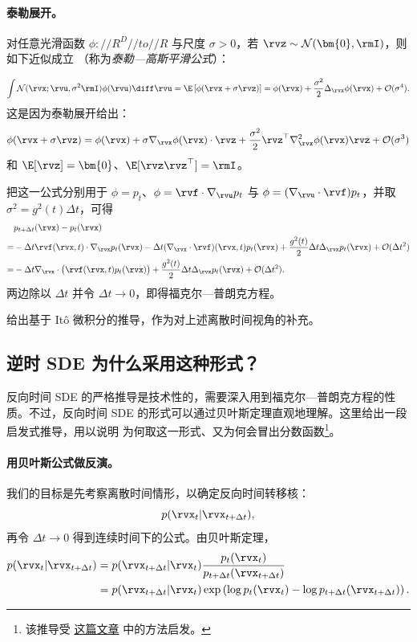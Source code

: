 \paragraph{泰勒展开。}
对任意光滑函数 $\phi://R^D//to//R$ 与尺度 $\sigma>0$，若 $\rvz\sim\mathcal N(\bm{0},\rmI)$，则如下近似成立
（称为\emph{泰勒—高斯平滑公式}）：

\[
\int \mathcal N(\rvx;\rvu,\sigma^2\rmI) \phi(\rvu) \diff\rvu
=\E \left[\phi(\rvx+\sigma\rvz)\right]
=\phi(\rvx)+\frac{\sigma^2}{2} \Delta_\rvx\phi(\rvx)+\mathcal O(\sigma^4).
\]
这是因为泰勒展开给出：
\[
\phi(\rvx+\sigma\rvz)=\phi(\rvx)+\sigma\nabla_\rvx\phi(\rvx) \cdot \rvz+\frac{\sigma^2}{2}\rvz^\top\nabla_\rvx^2\phi(\rvx)\rvz+\mathcal O(\sigma^3)
\]
和 $\E[\rvz]=\bm{0}$、$\E[\rvz\rvz^\top]=\rmI$。

把这一公式分别用于 $\phi=p_t$、$\phi=\rvf \cdot \nabla_\rvu p_t$ 与 $\phi=(\nabla_\rvu \cdot\rvf) p_t$，并取 $\sigma^2=g^2(t)\Delta t$，可得
\[
\begin{aligned}
&p_{t+\Delta t}(\rvx) - p_t(\rvx)
\\=& -\Delta t \rvf(\rvx,t) \cdot \nabla_\rvx p_t(\rvx)
-\Delta t (\nabla_\rvx \cdot\rvf)(\rvx,t) p_t(\rvx)
+\frac{g^2(t)}{2}\Delta t \Delta_\rvx p_t(\rvx)
+\mathcal O(\Delta t^2)
\\=&  - \Delta t \nabla_\rvx \cdot \big(\rvf(\rvx,t) p_t(\rvx)\big)
 + \frac{g^2(t)}{2} \Delta t \Delta_\rvx p_t(\rvx)
 + \mathcal O(\Delta t^2).
\end{aligned}
\]
两边除以 $\Delta t$ 并令 $\Delta t\to0$，即得福克尔—普朗克方程。

 给出基于 It\^o 微积分的推导，作为对上述离散时间视角的补充。


\subsection{逆时 SDE 为什么采用这种形式？}\label{subsec:reverse-sde-reason}

反向时间 SDE 的严格推导是技术性的，需要深入用到福克尔—普朗克方程的性质。不过，反向时间 SDE 的形式可以通过贝叶斯定理直观地理解。这里给出一段启发式推导，用以说明  为何取这一形式、又为何会冒出分数函数\footnote{该推导受 \href{https://alexxthiery.github.io/notes/reverse_and_tweedie/reverse_and_tweedie.html}{这篇文章} 中的方法启发。}。


\paragraph{用贝叶斯公式做反演。}
我们的目标是先考察离散时间情形，以确定反向时间转移核：
\[
p(\rvx_t | \rvx_{t+\Delta t}),
\]
再令 $\Delta t \rightarrow 0$ 得到连续时间下的公式。由贝叶斯定理，
\begin{align}\label{eq:reverse-sde-bayes-discrete}
    p(\rvx_t | \rvx_{t+\Delta t})
    &= p(\rvx_{t+\Delta t} | \rvx_t) \frac{p_t(\rvx_t)}{p_{t+\Delta t}(\rvx_{t+\Delta t})} \nonumber \\
    &= p(\rvx_{t+\Delta t} | \rvx_t) \exp\left(\log p_t(\rvx_t) - \log p_{t+\Delta t}(\rvx_{t+\Delta t})\right).
\end{align}

